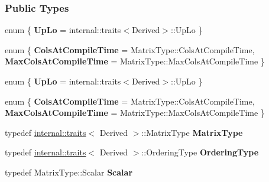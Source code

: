 \subsubsection*{Public Types}
\begin{DoxyCompactItemize}
\item 
\mbox{\label{group___sparse_cholesky___module_ab03bc806b30481833d750b041361b9e2}} 
enum \{ {\bfseries Up\+Lo} = internal\+:\+:traits$<$Derived$>$\+:\+:Up\+Lo
 \}
\item 
\mbox{\label{group___sparse_cholesky___module_aff11a8c7c28d260de9bcf43ec669d182}} 
enum \{ {\bfseries Cols\+At\+Compile\+Time} = Matrix\+Type\+:\+:Cols\+At\+Compile\+Time, 
{\bfseries Max\+Cols\+At\+Compile\+Time} = Matrix\+Type\+:\+:Max\+Cols\+At\+Compile\+Time
 \}
\item 
\mbox{\label{group___sparse_cholesky___module_aafe2209c697619ca395efff76c88f582}} 
enum \{ {\bfseries Up\+Lo} = internal\+:\+:traits$<$Derived$>$\+:\+:Up\+Lo
 \}
\item 
\mbox{\label{group___sparse_cholesky___module_a719505aa940a38a2f003cad55d94659c}} 
enum \{ {\bfseries Cols\+At\+Compile\+Time} = Matrix\+Type\+:\+:Cols\+At\+Compile\+Time, 
{\bfseries Max\+Cols\+At\+Compile\+Time} = Matrix\+Type\+:\+:Max\+Cols\+At\+Compile\+Time
 \}
\item 
\mbox{\label{group___sparse_cholesky___module_ac4d3851843aa1a04ce4849cc6ed27f71}} 
typedef \hyperlink{struct_eigen_1_1internal_1_1traits}{internal\+::traits}$<$ Derived $>$\+::Matrix\+Type {\bfseries Matrix\+Type}
\item 
\mbox{\label{group___sparse_cholesky___module_afb046a5d3d43cd0c7d49e934db5c2091}} 
typedef \hyperlink{struct_eigen_1_1internal_1_1traits}{internal\+::traits}$<$ Derived $>$\+::Ordering\+Type {\bfseries Ordering\+Type}
\item 
\mbox{\label{group___sparse_cholesky___module_a5bbf431a4e3fa0484560e206749cea02}} 
typedef Matrix\+Type\+::\+Scalar {\bfseries Scalar}
\item 

\end{DoxyCompactItemize}
